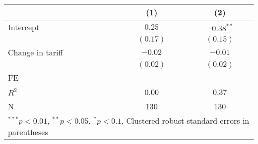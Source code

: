 
\begin{tabular}{l c c }
\hline
 & (1) & (2) \\
\hline
Intercept & $0.25$   & $-0.38^{**}$ \\
            & $(0.17)$ & $(0.15)$     \\
Change in tariff     & $-0.02$  & $-0.01$      \\
            & $(0.02)$ & $(0.02)$     \\
\hline
FE          &                &                \\ 
\hline
$R^2$       & 0.00     & 0.37         \\
N           & 130      & 130          \\
\hline
\multicolumn{3}{l}{\scriptsize{$^{***}p<0.01$, $^{**}p<0.05$, $^*p<0.1$, Clustered-robust standard errors in parentheses}}
\end{tabular}
